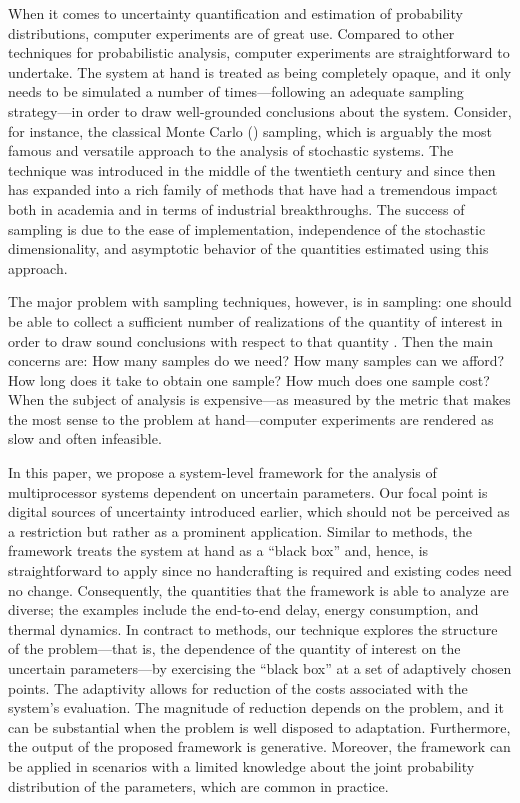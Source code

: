 When it comes to uncertainty quantification and estimation of probability
distributions, computer experiments \cite{santner2003} are of great use.
Compared to other techniques for probabilistic analysis, computer experiments
are straightforward to undertake. The system at hand is treated as being
completely opaque, and it only needs to be simulated a number of
times---following an adequate sampling strategy---in order to draw well-grounded
conclusions about the system. Consider, for instance, the classical Monte Carlo
() sampling, which is arguably the most famous and versatile approach
to the analysis of stochastic systems. The technique was introduced in the
middle of the twentieth century and since then has expanded into a rich family
of methods that have had a tremendous impact both in academia and in terms of
industrial breakthroughs. The success of  sampling is due to the ease
of implementation, independence of the stochastic dimensionality, and asymptotic
behavior of the quantities estimated using this approach.

The major problem with sampling techniques, however, is in sampling: one should
be able to collect a sufficient number of realizations of the quantity of
interest in order to draw sound conclusions with respect to that quantity
\cite{diaz-emparanza2002}. Then the main concerns are: How many samples do we
need? How many samples can we afford? How long does it take to obtain one
sample? How much does one sample cost? When the subject of analysis is
expensive---as measured by the metric that makes the most sense to the problem
at hand---computer experiments are rendered as slow and often infeasible.

In this paper, we propose a system-level framework for the analysis of
multiprocessor systems dependent on uncertain parameters. Our focal point is
digital sources of uncertainty introduced earlier, which should not be perceived
as a restriction but rather as a prominent application. Similar to 
methods, the framework treats the system at hand as a ``black box'' and, hence,
is straightforward to apply since no handcrafting is required and existing codes
need no change. Consequently, the quantities that the framework is able to
analyze are diverse; the examples include the end-to-end delay, energy
consumption, and thermal dynamics. In contract to  methods, our
technique explores the structure of the problem---that is, the dependence of the
quantity of interest on the uncertain parameters---by exercising the ``black
box'' at a set of adaptively chosen points. The adaptivity allows for reduction
of the costs associated with the system's evaluation. The magnitude of reduction
depends on the problem, and it can be substantial when the problem is well
disposed to adaptation. Furthermore, the output of the proposed framework is
generative. Moreover, the framework can be applied in scenarios with a limited
knowledge about the joint probability distribution of the parameters, which are
common in practice.

